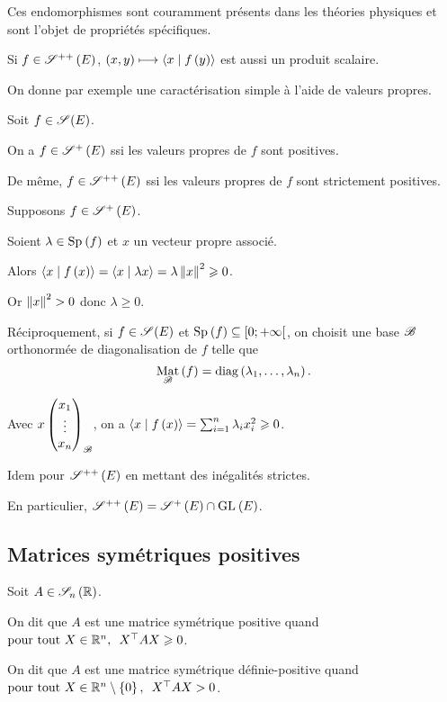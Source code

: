Ces endomorphismes sont couramment présents dans les théories physiques et sont l'objet de propriétés spécifiques.

\begin{rem}
Si \(f\in\symdefpos{}[E]\), \(\paren{x,y}\mapsto\ps{x}{f\paren{y}}\) est aussi un produit scalaire.
\end{rem}

On donne par exemple une caractérisation simple à l'aide de valeurs propres.

\begin{prop}
Soit \(f\in\sym{}[E]\).

On a \(f\in\sympos{}[E]\) ssi les valeurs propres de \(f\) sont positives.

De même, \(f\in\symdefpos{}[E]\) ssi les valeurs propres de \(f\) sont strictement positives.
\end{prop}

\begin{dem}
Supposons \(f\in\sympos{}[E]\).

Soient \(\lambda\in\Sp{f}\) et \(x\) un vecteur propre associé.

Alors \(\ps{x}{f\paren{x}}=\ps{x}{\lambda x}=\lambda\norme{x}^2\geq0\).

Or \(\norme{x}^2>0\) donc \(\lambda\geq0\).

Réciproquement, si \(f\in\sym{}[E]\) et \(\Sp{f}\subset\intervie{0}{\pinf}\), on choisit une base \(\mathscr{B}\) orthonormée de diagonalisation de \(f\) telle que \[\Mat{f}=\diag{\lambda_1,\dots,\lambda_n}.\]

Avec \(x\begin{pmatrix}x_1\\\vdots\\x_n\end{pmatrix}_{\mathscr{B}}\), on a \(\ps{x}{f\paren{x}}=\sum_{i=1}^n\lambda_ix_i^2\geq0\).

Idem pour \(\symdefpos{}[E]\) en mettant des inégalités strictes.
\end{dem}

En particulier, \(\symdefpos{}[E]=\sympos{}[E]\inter\GL{}[E]\).

\subsection{Matrices symétriques positives}

\begin{defi}
Soit \(A\in\sym{n}[\R]\).

On dit que \(A\) est une matrice symétrique positive quand \(\quantifs{\tpt X\in\R^n}\trans{X}AX\geq0\).

On dit que \(A\) est une matrice symétrique définie-positive quand \(\quantifs{\tpt X\in\R^n\excluant\accol{0}}\trans{X}AX>0\).
\end{defi}

